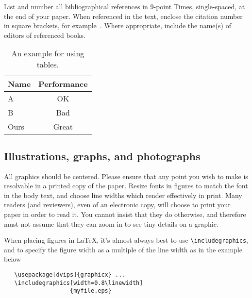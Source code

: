 \documentclass[10pt,twocolumn,letterpaper]{article}
\begin{document}
List and number all bibliographical references in 9-point Times,
single-spaced, at the end of your paper. When referenced in the text,
enclose the citation number in square brackets, for
example~\cite{Authors12}.  Where appropriate, include the name(s) of
editors of referenced books.

\begin{table}
\begin{center}
\begin{tabular}{|l|c|}
\hline
Name & Performance \\
\hline\hline
A & OK\\
B & Bad \\
Ours & Great\\
\hline
\end{tabular}
\end{center}
\caption{An example for using tables.}
\end{table}

\subsection{Illustrations, graphs, and photographs}

All graphics should be centered.  Please ensure that any point you wish to
make is resolvable in a printed copy of the paper.  Resize fonts in figures
to match the font in the body text, and choose line widths which render
effectively in print.  Many readers (and reviewers), even of an electronic
copy, will choose to print your paper in order to read it.  You cannot
insist that they do otherwise, and therefore must not assume that they can
zoom in to see tiny details on a graphic.

When placing figures in \LaTeX, it's almost always best to use
\verb+\includegraphics+, and to specify the  figure width as a multiple of
the line width as in the example below
{\small\begin{verbatim}
   \usepackage[dvips]{graphicx} ...
   \includegraphics[width=0.8\linewidth]
                   {myfile.eps}
\end{verbatim}
}



{\small


}
\end{document}
